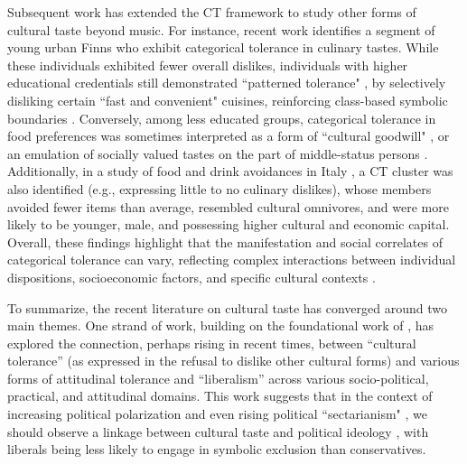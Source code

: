 \documentclass[12pt]{article}
\begin{document}
Subsequent work has extended the CT framework to study other forms of cultural taste beyond music. For instance, recent work identifies a segment of young urban Finns who exhibit categorical tolerance in culinary tastes. While these individuals exhibited fewer overall dislikes, individuals with higher educational credentials still demonstrated ``patterned tolerance" \citep{bryson1996anything-311}, by selectively disliking certain ``fast and convenient" cuisines, reinforcing class-based symbolic boundaries \citep{lindblom2019anything-530}. Conversely, among less educated groups, categorical tolerance in food preferences was sometimes interpreted as a form of ``cultural goodwill" \citep{bourdieu1984distinction-835}, or an emulation of socially valued tastes on the part of middle-status persons \citep{lindblom2019anything-530}. Additionally, in a study of food and drink avoidances in Italy \citep{oncini2023cultural-323}, a CT cluster was also identified (e.g., expressing little to no culinary dislikes), whose members avoided fewer items than average, resembled cultural omnivores, and were more likely to be younger, male, and possessing higher cultural and economic capital. Overall, these findings highlight that the manifestation and social correlates of categorical tolerance can vary, reflecting complex interactions between individual dispositions, socioeconomic factors, and specific cultural contexts \citep{lindblom2019anything-530, oncini2023cultural-323}.

To summarize, the recent literature on cultural taste has converged around two main themes. One strand of work, building on the foundational work of \citep{bryson1996anything-311}, has explored the connection, perhaps rising in recent times, between ``cultural tolerance'' (as expressed in the refusal to dislike other cultural forms) and various forms of attitudinal tolerance and ``liberalism'' across various socio-political, practical, and attitudinal domains. This work suggests that in the context of increasing political polarization and even rising political ``sectarianism" \citep{finkel2020political-78d}, we should observe a linkage between cultural taste and political ideology \citep{rawlings2023polarization-0af}, with liberals being less likely to engage in symbolic exclusion than conservatives. 
\end{document}
